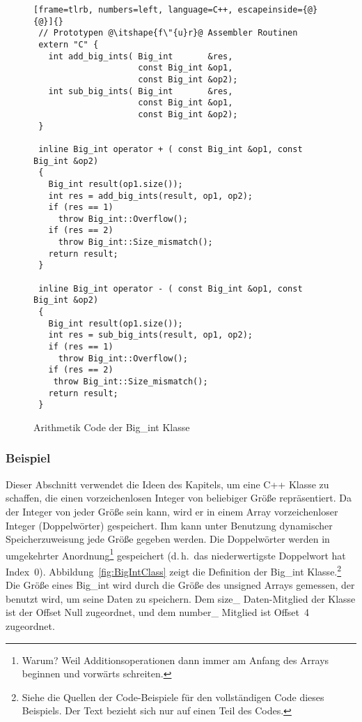\begin{figure}[tp]
\begin{lstlisting}[frame=tlrb, numbers=left, language=C++, escapeinside={@}{@}]{}
 // Prototypen @\itshape{f\"{u}r}@ Assembler Routinen
 extern "C" {
   int add_big_ints( Big_int       &res,
                     const Big_int &op1,
                     const Big_int &op2);
   int sub_big_ints( Big_int       &res,
                     const Big_int &op1,
                     const Big_int &op2);
 }

 inline Big_int operator + ( const Big_int &op1, const Big_int &op2)
 {
   Big_int result(op1.size());
   int res = add_big_ints(result, op1, op2);
   if (res == 1)
     throw Big_int::Overflow();
   if (res == 2)
     throw Big_int::Size_mismatch();
   return result;
 }

 inline Big_int operator - ( const Big_int &op1, const Big_int &op2)
 {
   Big_int result(op1.size());
   int res = sub_big_ints(result, op1, op2);
   if (res == 1)
     throw Big_int::Overflow();
   if (res == 2)
    throw Big_int::Size_mismatch();
   return result;
 }
\end{lstlisting}
\caption{Arithmetik Code der {\code Big\_int} Klasse \label{fig:BigIntAdd}}
\end{figure}

\subsubsection{Beispiel} 
Dieser Abschnitt verwendet die Ideen des Kapitels, um eine C++
Klasse zu schaffen, die einen vorzeichenlosen Integer von beliebiger
Gr\"{o}{\ss}e repr\"{a}sentiert. Da der Integer von jeder Gr\"{o}{\ss}e sein kann, wird
er in einem Array vorzeichenloser Integer (Doppelw\"{o}rter)
gespeichert. Ihm kann unter Benutzung dynamischer Speicherzuweisung
jede Gr\"{o}{\ss}e gegeben werden. Die Doppelw\"{o}rter werden in umgekehrter
Anordnung\footnote{Warum? Weil Additionsoperationen dann immer am
Anfang des Arrays beginnen und vorw\"{a}rts schreiten.} gespeichert
(d.\,h.\ das niederwertigste Doppelwort hat Index~0).
Abbildung~\ref{fig:BigIntClass} zeigt die Definition der {\code
Big\_int} Klasse.\footnote{Siehe die Quellen der Code-Beispiele f\"{u}r
den vollst\"{a}ndigen Code dieses Beispiels. Der Text bezieht sich nur
auf einen Teil des Codes.} Die Gr\"{o}{\ss}e eines {\code Big\_int} wird
durch die Gr\"{o}{\ss}e des {\code unsigned} Arrays gemessen, der benutzt
wird, um seine Daten zu speichern. Dem {\code size\_} Daten-Mitglied
der Klasse ist der Offset Null zugeordnet, und dem {\code number\_}
Mitglied ist Offset~4 zugeordnet.

